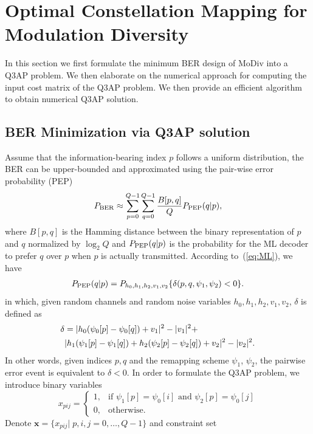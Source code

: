 \documentclass[journal,draftcls,onecolumn,12pt,twoside]{IEEEtran}
\newcommand{\PEP}{\rm{PEP}}
\newcommand{\BER}{\rm{BER}}
\begin{document}
\section{Optimal Constellation Mapping for Modulation Diversity}
\label{sec:core}
In this section we first formulate the minimum BER design of MoDiv into a Q3AP
problem. We then elaborate on the numerical approach for computing the input
cost matrix of the Q3AP problem. We then provide an efficient algorithm to
obtain numerical Q3AP solution.

\subsection{BER Minimization via Q3AP solution}
Assume that the information-bearing index $p$ follows a uniform distribution,
the BER can be upper-bounded and approximated using the pair-wise error
probability (PEP)~\cite{harvind2005symbol}
\begin{align}
    P_{\BER} \approx \sum_{p=0}^{Q - 1}\sum_{q=0}^{Q - 1}\frac{B[p,
    q]}{Q}P_{\PEP}(q | p), \label{eq:P_BER}
\end{align}
where $B[p,q]$ is the Hamming distance between the binary representation of $p$
and $q$ normalized by $\log_2Q$ and $P_{\PEP}(q | p)$ is the probability for the
ML decoder to prefer $q$ over $p$ when $p$ is actually transmitted. According
to~(\ref{eq:ML}), we have
\begin{align}
    P_{\PEP}(q | p) = P_{h_0,h_1,h_2,v_1,v_2}\{\delta(p,q,\psi_1,\psi_2) < 0\}.
    \label{eq:P_PEP}
\end{align}
in which, given random channels and random noise variables 
$h_0,h_1,h_2,v_1,v_2$, $\delta$ is defined as
\begin{align}
    \delta & = |h_0(\psi_0[p] - \psi_0[q]) + v_1|^2 - |v_1|^2 +\notag\\ 
    &
    |h_1(\psi_1[p] - \psi_1[q])+h_2(\psi_2[p] - \psi_2[q])+v_2|^2 -
    |v_2|^2.
    \label{eq:delta}
\end{align}
In other words, given indices $p, q$ and the remapping scheme $\psi_1$,
$\psi_2$, the pairwise error event is equivalent to $\delta<0$. In order to
formulate the Q3AP problem, we introduce binary variables
\[
    x_{pij}= \left\{\begin{array}{ll}
        1,& \mbox{if $\psi_1[p] = \psi_0[i]$ and $\psi_2[p] = \psi_0[j]$}\\
        0,& \mbox{otherwise.} \end{array} 
    \right.
\]
Denote $\mathbf{x} = \{x_{pij}|\;p,i,j=0,\ldots,Q-1\}$ and constraint set
\end{document}
